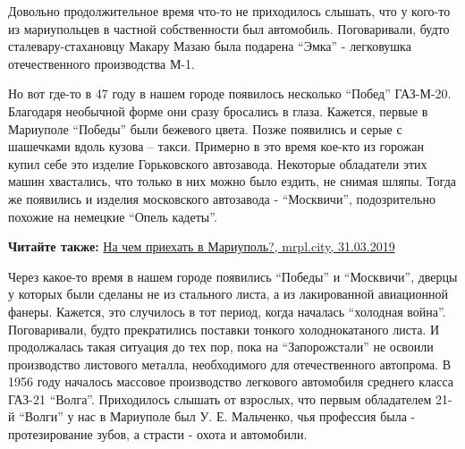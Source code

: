 Довольно продолжительное время что-то не приходилось слышать, что у кого-то из
мариупольцев в частной собственности был автомобиль. Поговаривали, будто
сталевару-стахановцу Макару Мазаю была подарена \enquote{Эмка} - легковушка
отечественного производства М-1.

Но вот где-то в 47 году в нашем городе появилось несколько \enquote{Побед} ГАЗ-М-20.
Благодаря необычной форме они сразу бросались в глаза. Кажется, первые в
Мариуполе \enquote{Победы} были бежевого цвета. Позже появились и серые с шашечками
вдоль кузова – такси. Примерно в это время кое-кто из горожан купил себе это
изделие Горьковского автозавода. Некоторые обладатели этих машин хвастались,
что только в них можно было ездить, не снимая шляпы. Тогда же появились и
изделия московского автозавода - \enquote{Москвичи}, подозрительно похожие на немецкие
\enquote{Опель кадеты}.

\textbf{Читайте также:} \href{https://mrpl.city/blogs/view/na-chem-priehat-v-mariupol}{%
На чем приехать в Мариуполь?, mrpl.city, 31.03.2019}

Через какое-то время в нашем городе появились \enquote{Победы} и \enquote{Москвичи}, дверцы у
которых были сделаны не из стального листа, а из лакированной авиационной
фанеры. Кажется, это случилось в тот период, когда началась \enquote{холодная война}.
Поговаривали, будто прекратились поставки тонкого холоднокатаного листа. И
продолжалась такая ситуация до тех пор, пока на \enquote{Запорожстали} не освоили
производство листового металла, необходимого для отечественного автопрома. В
1956 году началось массовое производство легкового автомобиля среднего класса
ГАЗ-21 \enquote{Волга}. Приходилось слышать от взрослых, что первым обладателем 21-й
\enquote{Волги} у нас в Мариуполе был У. Е. Мальченко, чья профессия была -
протезирование зубов, а страсти - охота и автомобили.
